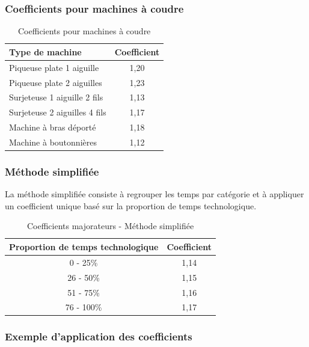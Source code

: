 \documentclass[a4paper,12pt]{article}
\begin{document}
\subsubsection{Coefficients pour machines à coudre}

\begin{table}[ht]
\centering
\begin{tabular}{|l|c|}
\hline
\textbf{Type de machine} & \textbf{Coefficient} \\
\hline
Piqueuse plate 1 aiguille & 1,20 \\
Piqueuse plate 2 aiguilles & 1,23 \\
Surjeteuse 1 aiguille 2 fils & 1,13 \\
Surjeteuse 2 aiguilles 4 fils & 1,17 \\
Machine à bras déporté & 1,18 \\
Machine à boutonnières & 1,12 \\
\hline
\end{tabular}
\caption{Coefficients pour machines à coudre}
\end{table}

\subsubsection{Méthode simplifiée}

La méthode simplifiée consiste à regrouper les temps par catégorie et à appliquer un coefficient unique basé sur la proportion de temps technologique.

\begin{table}[ht]
\centering
\begin{tabular}{|c|c|}
\hline
\textbf{Proportion de temps technologique} & \textbf{Coefficient} \\
\hline
0 - 25\% & 1,14 \\
26 - 50\% & 1,15 \\
51 - 75\% & 1,16 \\
76 - 100\% & 1,17 \\
\hline
\end{tabular}
\caption{Coefficients majorateurs - Méthode simplifiée}
\end{table}

\subsubsection{Exemple d'application des coefficients}
\end{document}
